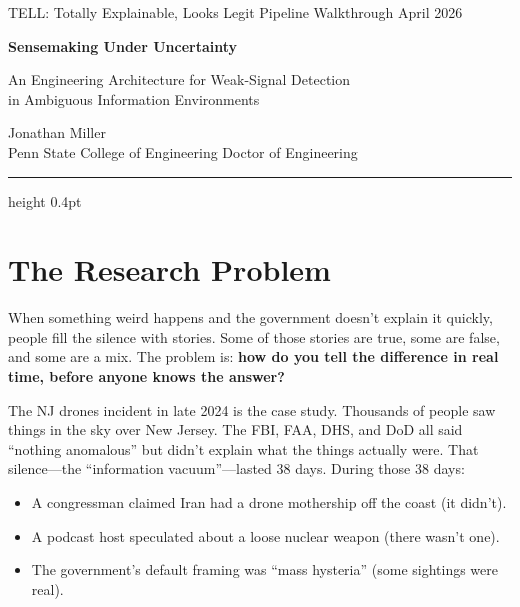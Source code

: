\documentclass[11pt, letterpaper]{article}
\begin{document}
\begin{center}
  {\small\textcolor{muted}{%
    TELL: Totally Explainable, Looks Legit \;\textbullet\;
    Pipeline Walkthrough \;\textbullet\;
    April 2026%
  }}

  \vspace{0.8em}
  {\LARGE\bfseries Sensemaking Under Uncertainty}

  \vspace{0.3em}
  {\large An Engineering Architecture for Weak-Signal Detection\\
  in Ambiguous Information Environments}

  \vspace{0.6em}
  {\normalsize Jonathan Miller}\\[2pt]
  {\small Penn State College of Engineering \;\textbullet\; Doctor of Engineering}
\end{center}

\vspace{1.2em}
\hrule height 0.4pt
\vspace{1.2em}


\section{The Research Problem}

When something weird happens and the government doesn't explain it quickly, people fill the silence with stories.
Some of those stories are true, some are false, and some are a mix.
The problem is: \textbf{how do you tell the difference in real time, before anyone knows the answer?}

The NJ drones incident in late 2024 is the case study.
Thousands of people saw things in the sky over New Jersey.
The FBI, FAA, DHS, and DoD all said ``nothing anomalous'' but didn't explain what the things actually were.
That silence---the ``information vacuum''---lasted 38 days.
During those 38 days:

\begin{itemize}[nosep]
  \item A congressman claimed Iran had a drone mothership off the coast (it didn't).
  \item A podcast host speculated about a loose nuclear weapon (there wasn't one).
  \item The government's default framing was ``mass hysteria'' (some sightings were real).
\end{itemize}
\end{document}
